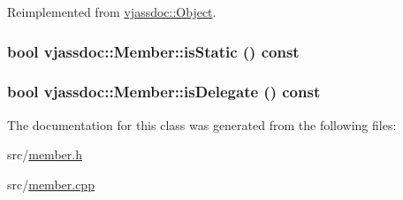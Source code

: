 Reimplemented from \hyperlink{classvjassdoc_1_1Object_b3729c3b063682f94b43a42546c90e96}{vjassdoc::Object}.\hypertarget{classvjassdoc_1_1Member_f832d9e8d585167eb8cb3e9051b03ba0}{
\subsubsection{\setlength{\rightskip}{0pt plus 5cm}bool vjassdoc::Member::isStatic () const}}
\label{classvjassdoc_1_1Member_f832d9e8d585167eb8cb3e9051b03ba0}


\hypertarget{classvjassdoc_1_1Member_d6df00fb8a3bfe32915e00c7ddb8fbbe}{
\subsubsection{\setlength{\rightskip}{0pt plus 5cm}bool vjassdoc::Member::isDelegate () const}}
\label{classvjassdoc_1_1Member_d6df00fb8a3bfe32915e00c7ddb8fbbe}




The documentation for this class was generated from the following files:\begin{CompactItemize}
\item 
src/\hyperlink{member_8h}{member.h}\item 
src/\hyperlink{member_8cpp}{member.cpp}\end{CompactItemize}
